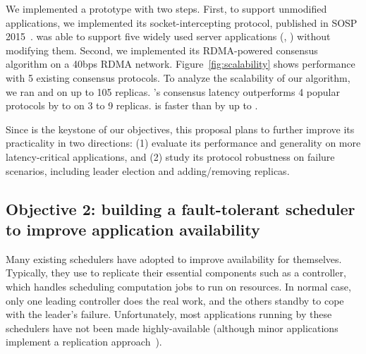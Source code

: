 
 We implemented a \falcon prototype with two steps. First,
to support unmodified applications, we implemented its socket-intercepting protocol,
published in SOSP 2015~\cite{crane:sosp15}. \falcon was able to support five widely
used server applications (\eg, \mysql) without modifying them. Second, we implemented its
RDMA-powered consensus algorithm on a 40bps RDMA network. Figure~\ref{fig:scalability}
shows \falcon performance with 5 existing consensus protocols. To analyze the scalability
of our algorithm, we ran \falcon and \dare on up to 105 replicas. \falcon's consensus latency 
outperforms 4 popular \paxos  protocols by \comptradlow to \comptradhigh on 3 to 9 replicas.
\falcon is  faster than \dare by up to \fasterDARE.



 Since \falcon is the keystone of our objectives, this 
proposal plans to further improve its practicality in two directions: 
(1) evaluate its performance and generality on more latency-critical applications, 
and (2) study its protocol robustness on failure scenarios, including leader
election and adding/removing replicas.

\vspace{-.15in}\subsection{Objective 2: 
building a fault-tolerant scheduler to improve 
application availability}\label{sec:scheduler}\vspace{-.075in}

Many existing schedulers have adopted \paxos to improve availability for 
themselves. Typically, they use \paxos to replicate their essential components 
such as a controller, which handles scheduling computation jobs to run on 
resources. In normal case, only one leading controller does the real 
work, and the others standby to cope with the leader's failure. Unfortunately, 
most applications running by these schedulers have not been made 
highly-available (although minor applications implement a replication 
approach~\cite{mapreduce,dolly:nsdi13}).

